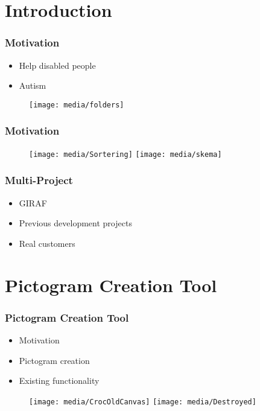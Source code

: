 


\section{Introduction}
\begin{frame}
	\frametitle{Motivation}
	\begin{itemize}
		\item Help disabled people
		\item Autism
	\end{itemize}
	\begin{figure}
		\texttt{[image: media/folders]}
	\end{figure}
\end{frame}

\begin{frame}
	\frametitle{Motivation}
	\begin{figure}
		\texttt{[image: media/Sortering]}		
		\hfill
		\texttt{[image: media/skema]}
	\end{figure}
\end{frame}

\begin{frame}
	\frametitle{Multi-Project}
	\begin{itemize}
		\item GIRAF
		\item Previous development projects
		\item Real customers
	\end{itemize}
\end{frame}
	
	
	
\section{Pictogram Creation Tool}
\begin{frame}
	\frametitle{Pictogram Creation Tool}
	\begin{itemize}
		\item Motivation
		\item Pictogram creation
		\item Existing functionality
	\end{itemize}
	\begin{figure}
		\texttt{[image: media/CrocOldCanvas]}
		\hfill
		\texttt{[image: media/Destroyed]}
	\end{figure}
\end{frame}